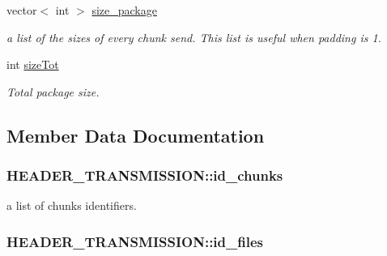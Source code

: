 \begin{DoxyCompactItemize}
vector$<$ int $>$ \hyperlink{structHEADER__TRANSMISSION_a08672f07c936f6bc4127fe255ea0ce7e}{size\-\_\-package}
\begin{DoxyCompactList}\small\item\em a list of the sizes of every chunk send. This list is useful when padding is 1. \end{DoxyCompactList}\item 
int \hyperlink{structHEADER__TRANSMISSION_a0654a40688064ef0925896891de48b43}{size\-Tot}
\begin{DoxyCompactList}\small\item\em Total package size. \end{DoxyCompactList}\end{DoxyCompactItemize}


\subsection{Member Data Documentation}
\hypertarget{structHEADER__TRANSMISSION_a3fa5dd88f6fc08f8c64eaee74408ce0e}{
\subsubsection[{id\-\_\-chunks}]{\setlength{\rightskip}{0pt plus 5cm}H\-E\-A\-D\-E\-R\-\_\-\-T\-R\-A\-N\-S\-M\-I\-S\-S\-I\-O\-N\-::id\-\_\-chunks}}\label{structHEADER__TRANSMISSION_a3fa5dd88f6fc08f8c64eaee74408ce0e}


a list of chunks identifiers. 

\hypertarget{structHEADER__TRANSMISSION_a7d6396f1a9a35defc1b44e00c663b412}{
\subsubsection[{id\-\_\-files}]{\setlength{\rightskip}{0pt plus 5cm}H\-E\-A\-D\-E\-R\-\_\-\-T\-R\-A\-N\-S\-M\-I\-S\-S\-I\-O\-N\-::id\-\_\-files}}\label{structHEADER__TRANSMISSION_a7d6396f1a9a35defc1b44e00c663b412}


